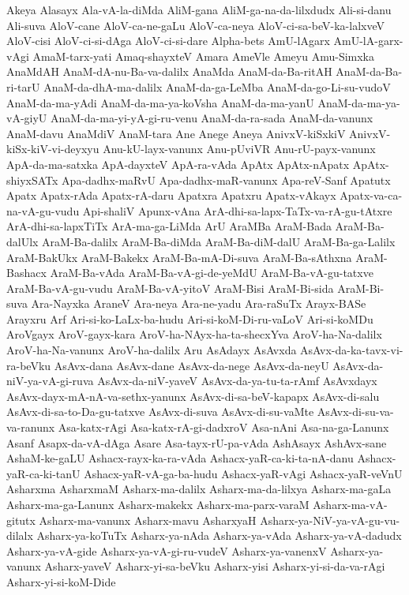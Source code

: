 {Akeya
Alasayx
Ala-vA-la-diMda
AliM-gana
AliM-ga-na-da-lilxdudx
Ali-si-danu
Ali-suva
AloV-cane
AloV-ca-ne-gaLu
AloV-ca-neya
AloV-ci-sa-beV-ka-lalxveV
AloV-cisi
AloV-ci-si-dAga
AloV-ci-si-dare
Alpha-bets
AmU-lAgarx
AmU-lA-garx-vAgi
AmaM-tarx-yati
Amaq-shayxteV
Amara
AmeVle
Ameyu
Amu-Simxka
AnaMdAH
AnaM-dA-nu-Ba-va-dalilx
AnaMda
AnaM-da-Ba-ritAH
AnaM-da-Ba-ri-tarU
AnaM-da-dhA-ma-dalilx
AnaM-da-ga-LeMba
AnaM-da-go-Li-su-vudoV
AnaM-da-ma-yAdi
AnaM-da-ma-ya-koVsha
AnaM-da-ma-yanU
AnaM-da-ma-ya-vA-giyU
AnaM-da-ma-yi-yA-gi-ru-venu
AnaM-da-ra-sada
AnaM-da-vanunx
AnaM-davu
AnaMdiV
AnaM-tara
Ane
Anege
Aneya
AnivxV-kiSxkiV
AnivxV-kiSx-kiV-vi-deyxyu
Anu-kU-layx-vanunx
Anu-pUviVR
Anu-rU-payx-vanunx
ApA-da-ma-satxka
ApA-dayxteV
ApA-ra-vAda
ApAtx
ApAtx-nApatx
ApAtx-shiyxSATx
Apa-dadhx-maRvU
Apa-dadhx-maR-vanunx
Apa-reV-Sanf
Apatutx
Apatx
Apatx-rAda
Apatx-rA-daru
Apatxra
Apatxru
Apatx-vAkayx
Apatx-va-ca-na-vA-gu-vudu
Api-shaliV
Apunx-vAna
ArA-dhi-sa-lapx-TaTx-va-rA-gu-tAtxre
ArA-dhi-sa-lapxTiTx
ArA-ma-ga-LiMda
ArU
AraMBa
AraM-Bada
AraM-Ba-dalUlx
AraM-Ba-dalilx
AraM-Ba-diMda
AraM-Ba-diM-dalU
AraM-Ba-ga-Lalilx
AraM-BakUkx
AraM-Bakekx
AraM-Ba-mA-Di-suva
AraM-Ba-sAthxna
AraM-Bashacx
AraM-Ba-vAda
AraM-Ba-vA-gi-de-yeMdU
AraM-Ba-vA-gu-tatxve
AraM-Ba-vA-gu-vudu
AraM-Ba-vA-yitoV
AraM-Bisi
AraM-Bi-sida
AraM-Bi-suva
Ara-Nayxka
AraneV
Ara-neya
Ara-ne-yadu
Ara-raSuTx
Arayx-BASe
Arayxru
Arf
Ari-si-ko-LaLx-ba-hudu
Ari-si-koM-Di-ru-vaLoV
Ari-si-koMDu
AroVgayx
AroV-gayx-kara
AroV-ha-NAyx-ha-ta-shecxYva
AroV-ha-Na-dalilx
AroV-ha-Na-vanunx
AroV-ha-dalilx
Aru
AsAdayx
AsAvxda
AsAvx-da-ka-tavx-vi-ra-beVku
AsAvx-dana
AsAvx-dane
AsAvx-da-nege
AsAvx-da-neyU
AsAvx-da-niV-ya-vA-gi-ruva
AsAvx-da-niV-yaveV
AsAvx-da-ya-tu-ta-rAmf
AsAvxdayx
AsAvx-dayx-mA-nA-va-sethx-yanunx
AsAvx-di-sa-beV-kapapx
AsAvx-di-salu
AsAvx-di-sa-to-Da-gu-tatxve
AsAvx-di-suva
AsAvx-di-su-vaMte
AsAvx-di-su-va-va-ranunx
Asa-katx-rAgi
Asa-katx-rA-gi-dadxroV
Asa-nAni
Asa-na-ga-Lanunx
Asanf
Asapx-da-vA-dAga
Asare
Asa-tayx-rU-pa-vAda
AshAsayx
AshAvx-sane
AshaM-ke-gaLU
Ashacx-rayx-ka-ra-vAda
Ashacx-yaR-ca-ki-ta-nA-danu
Ashacx-yaR-ca-ki-tanU
Ashacx-yaR-vA-ga-ba-hudu
Ashacx-yaR-vAgi
Ashacx-yaR-veVnU
Asharxma
AsharxmaM
Asharx-ma-dalilx
Asharx-ma-da-lilxya
Asharx-ma-gaLa
Asharx-ma-ga-Lanunx
Asharx-makekx
Asharx-ma-parx-varaM
Asharx-ma-vA-gitutx
Asharx-ma-vanunx
Asharx-mavu
AsharxyaH
Asharx-ya-NiV-ya-vA-gu-vu-dilalx
Asharx-ya-koTuTx
Asharx-ya-nAda
Asharx-ya-vAda
Asharx-ya-vA-dadudx
Asharx-ya-vA-gide
Asharx-ya-vA-gi-ru-vudeV
Asharx-ya-vanenxV
Asharx-ya-vanunx
Asharx-yaveV
Asharx-yi-sa-beVku
Asharx-yisi
Asharx-yi-si-da-va-rAgi
Asharx-yi-si-koM-Dide
}
